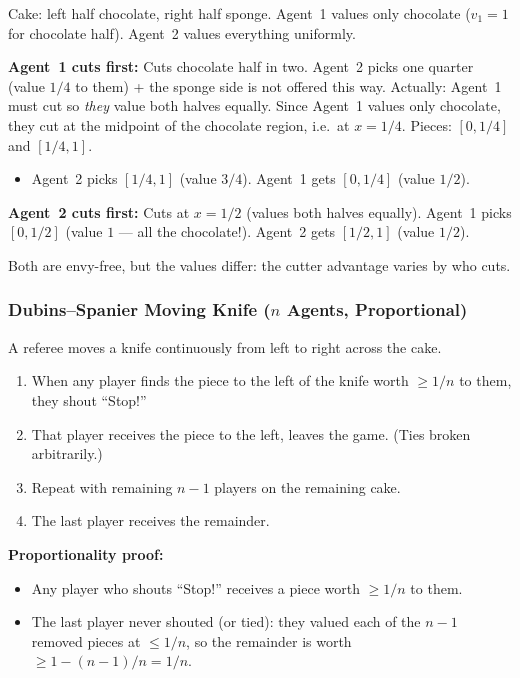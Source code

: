 \begin{exbox}
Cake: left half chocolate, right half sponge. Agent~1 values only chocolate ($v_1 = 1$ for chocolate half). Agent~2 values everything uniformly.

\textbf{Agent~1 cuts first:} Cuts chocolate half in two. Agent~2 picks one quarter (value $1/4$ to them) + the sponge side is not offered this way. Actually: Agent~1 must cut so \emph{they} value both halves equally. Since Agent~1 values only chocolate, they cut at the midpoint of the chocolate region, i.e.\ at $x = 1/4$. Pieces: $[0, 1/4]$ and $[1/4, 1]$.
\begin{itemize}
  \item Agent~2 picks $[1/4, 1]$ (value $3/4$). Agent~1 gets $[0, 1/4]$ (value $1/2$).
\end{itemize}

\textbf{Agent~2 cuts first:} Cuts at $x = 1/2$ (values both halves equally). Agent~1 picks $[0, 1/2]$ (value $1$ --- all the chocolate!). Agent~2 gets $[1/2, 1]$ (value $1/2$).

Both are envy-free, but the values differ: the cutter advantage varies by who cuts.
\end{exbox}

\separator

\subsubsection{Dubins--Spanier Moving Knife ($n$ Agents, Proportional)}

\begin{thmbox}
A referee moves a knife continuously from left to right across the cake.
\begin{enumerate}
  \item When any player finds the piece to the left of the knife worth $\ge 1/n$ to them, they shout ``Stop!''
  \item That player receives the piece to the left, leaves the game. (Ties broken arbitrarily.)
  \item Repeat with remaining $n-1$ players on the remaining cake.
  \item The last player receives the remainder.
\end{enumerate}
\end{thmbox}

\textbf{Proportionality proof:}
\begin{itemize}
  \item Any player who shouts ``Stop!'' receives a piece worth $\ge 1/n$ to them.
  \item The last player never shouted (or tied): they valued each of the $n-1$ removed pieces at $\le 1/n$, so the remainder is worth $\ge 1 - (n-1)/n = 1/n$.
\end{itemize}


